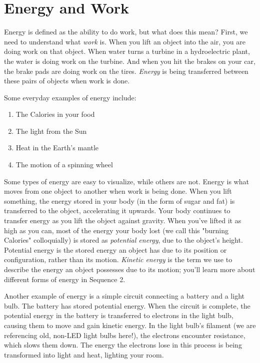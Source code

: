 \section{Energy and Work}

Energy is defined as the ability to do work, but what does this mean? First, we 
need to understand what \textit{work} is. When you lift an object into the air, 
you are doing work on that object. When water turns a turbine in a hydroelectric 
plant, the water is doing work on the turbine. And when you hit the brakes on your
car, the brake pads are doing work on the tires. 
\textit{Energy} is being transferred between these pairs of objects when work is 
done. 

Some everyday examples of energy include:
\begin{enumerate}
\item The Calories in your food
\item The light from the Sun
\item Heat in the Earth's mantle
\item The motion of a spinning wheel
\end{enumerate}

Some types of energy are easy to visualize, while others are not. Energy is what 
moves from one object to another when work is being done. When you lift 
something, the energy stored in your body (in the form of sugar and fat) is 
transferred to the object, accelerating it upwards. Your body continues to 
transfer energy as you lift the object against gravity. When you've lifted it as 
high as you can, most of the energy your body lost (we call this "burning 
Calories" colloquially) is stored as \textit{potential energy}, due to the 
object's height. Potential energy is the stored energy an object has due to its position or configuration, rather than its motion. \textit{Kinetic energy} is the term we use to describe the energy an object possesses due to its motion;  you'll learn more about different forms of energy in Sequence 2.

Another example of energy is a simple circuit connecting a battery and a light bulb. The 
battery has stored potential energy. When the circuit is complete, the potential 
energy in the battery is transferred to electrons in the light bulb, causing them 
to move and gain kinetic energy. In the light bulb's filament (we are referencing 
old, non-LED light bulbs here!), the electrons encounter resistance, which slows 
them down. The energy the electrons lose in this process is being transformed into 
light and heat, lighting your room. 


